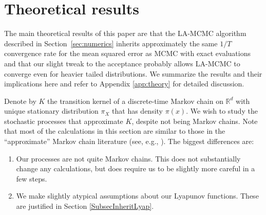 \section{Theoretical results} \label{sec:theory}

The main theoretical results of this paper are that the LA-MCMC algorithm described in Section~\ref{sec:numerics} inherits approximately the same $1/T$ convergence rate for the mean squared error as MCMC with exact evaluations and that our slight tweak to the acceptance probably allows LA-MCMC to converge even for heavier tailed distributions. We summarize the results and their implications here and refer to Appendix \ref{app:theory} for detailed discussion.

Denote by $K$ the transition kernel of a discrete-time Markov chain on $\mathbb{R}^{d}$ with unique stationary distribution $\pi_{X}$ that has density $\pi(x)$. We wish to study the stochastic processes that approximate $K$, despite not being Markov chains. Note that most of the calculations in this section are similar to those in the ``approximate'' Markov chain literature (see, e.g.,  \citet{Johndrowetal2015,Medinaetal2018,PillaiSmith2014,Rudolfetal2018}).  The biggest differences are:
\begin{enumerate}
    \item Our processes are not quite Markov chains. This does not substantially change any calculations, but does require us to be slightly more careful in a few steps.
    \item We make slightly atypical assumptions about our Lyapunov functions. These are justified in Section \ref{SubsecInheritLyap}.
\end{enumerate}

